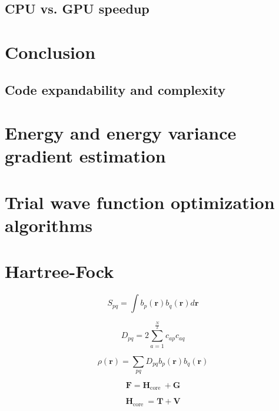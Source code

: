 \documentclass[final,3p,times,twocolumn]{elsarticle}
\begin{document}
\subsection{CPU vs. GPU speedup}
	


	
	\newpage
	\section{Conclusion}
	\label{sec:conclusion}
	
	\subsection{Code expandability and complexity}
		
	
	
	
	
	\appendix
	\section{Energy and energy variance gradient estimation}
	\label{app:gradients}
	
	\section{Trial wave function optimization algorithms}
	\label{app:optmethods}
	
	\section{Hartree-Fock}
	\label{app:HF}

	\begin{equation}
		S_{p q}=\int b_{p}(\mathbf{r}) b_{q}(\mathbf{r}) d \mathbf{r}
	\end{equation}

	\begin{equation}
		D_{p q}=2 \sum_{a=1}^{\frac{N}{2}} c_{a p} c_{a q}
	\end{equation}

	\begin{equation}
		\rho(\mathbf{r})=\sum_{p q} D_{p q} b_{p}(\mathbf{r}) b_{q}(\mathbf{r})
	\end{equation}

	\begin{equation}
		\mathbf{F}=\mathbf{H}_{\text {core }}+\mathbf{G}
	\end{equation}

	\begin{equation}
		\mathbf{H}_{\text {core }}=\mathbf{T}+\mathbf{V}
	\end{equation}
	
\end{document}
